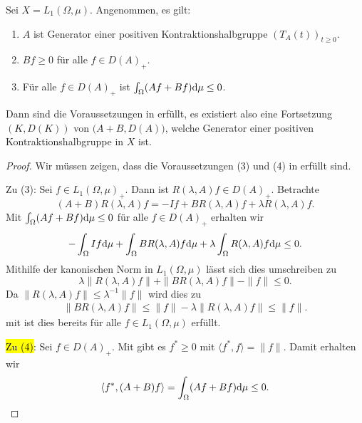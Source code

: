 \begin{fsatz}[Kato]\label{Hauptaussage in AL}
Sei  $X=L_1(\Omega, \mu)$. Angenommen, es gilt:
\begin{enumerate}
\item $A$ ist Generator einer positiven Kontraktionshalbgruppe $(T_A(t))_{t\geq0}$.
\item $Bf\geq0$ für alle $f\in D(A)_+$.
\item Für alle $f\in D(A)_+$ ist $\int_\Omega (Af+Bf)\textnormal d\mu\leq 0$.
\end{enumerate}
Dann sind die Voraussetzungen in  erfüllt, es existiert also eine Fortsetzung $(K, D(K))$ von $\big(A+B, D(A)\big)$, welche Generator einer positiven Kontraktionshalbgruppe in $X$ ist.
\end{fsatz}

\begin{proof}
\par
Wir müssen zeigen, dass die Voraussetzungen (3) und (4) in  erfüllt sind. 


\par
Zu (3): Sei $f\in L_1(\Omega,\mu)_+$. Dann ist $R(\lambda, A)f\in D(A)_+$. Betrachte
\begin{equation*}
(A+B)R(\lambda, A)f=-If+BR(\lambda, A)f+\lambda R(\lambda, A)f.
\end{equation*}
Mit $\int_\Omega (Af+Bf)\textnormal d\mu\leq 0$ für alle $f\in D(A)_+$ erhalten wir
\begin{equation*}
-\int_\Omega If\textnormal d\mu + \int_\Omega BR(\lambda, A)f\textnormal d\mu + \lambda \int_\Omega R(\lambda, A)f\textnormal d\mu\leq 0.
\end{equation*}
Mithilfe der kanonischen Norm in $L_1(\Omega, \mu)$ lässt sich dies umschreiben zu
\begin{equation*}
\lambda \|R(\lambda, A)f\| + \|BR(\lambda, A)f\| - \|f\|\leq 0.
\end{equation*}
Da $\|R(\lambda, A)f\|\leq \lambda^{-1}\|f\|$ wird dies zu
\begin{align*}
\|BR(\lambda, A)f\|\leq\|f\| - \lambda\|R(\lambda, A)f\|\leq \|f\|.
\end{align*}
mit \Cref{} ist dies bereits für alle $f\in L_1(\Omega,\mu)$ erfüllt.

\par
\hl{Zu (4)}: Sei $f\in D(A)_+$.  Mit  gibt es $f^*\geq0$ mit $\langle f^*, f\rangle=\|f\|$. Damit erhalten wir 
\begin{equation*}
\langle f^*, (A+B)f\rangle=\int_\Omega (Af+Bf)\textnormal d\mu\leq 0.
\end{equation*}

\end{proof}


